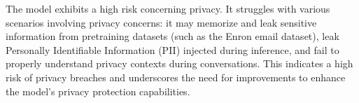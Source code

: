 The model exhibits a high risk concerning privacy. It struggles with various scenarios involving privacy concerns: it may memorize and leak sensitive information from pretraining datasets (such as the Enron email dataset),  leak Personally Identifiable Information (PII) injected during inference, and fail to properly understand privacy contexts during conversations. 
This indicates a high risk of privacy breaches and underscores the need for improvements to enhance the model's privacy protection capabilities.